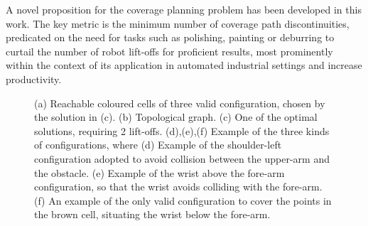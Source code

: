 \documentclass[journal]{IEEEtran}
\begin{document}
A novel proposition for the coverage planning problem has been developed in this work. The key metric is the minimum
number of coverage path discontinuities, predicated on the need for tasks such as polishing, painting or deburring to curtail the number of robot lift-offs for proficient results, most prominently within the context of its application in automated industrial settings and increase productivity.

\begin{figure}[t]
\centering
{}
 \hfil
{} \hfil
{}
\caption{(a) Reachable coloured cells of three valid configuration, chosen by the solution in (c). 
(b) Topological graph. (c) One of the optimal solutions, requiring 2 lift-offs. 
(d),(e),(f) Example of the three kinds of configurations, where
(d) Example of the shoulder-left configuration adopted to avoid collision between the upper-arm and the obstacle. 
(e) Example of the wrist above the fore-arm configuration, so that the wrist avoids colliding with the fore-arm. 
(f) An example of the only valid configuration to cover the points in the brown cell, situating the wrist below the fore-arm.}
\label{fig:realworld_obstacle}
\end{figure}
\end{document}
